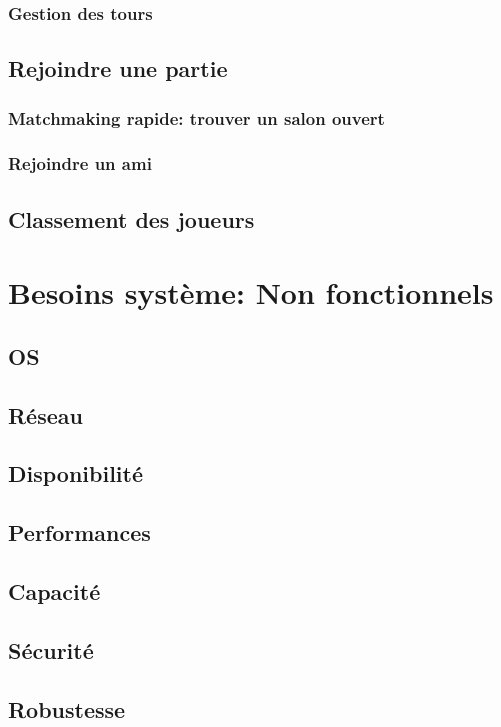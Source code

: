 \documentclass[utf8]{article}
\begin{document}
    \subsubsection{Gestion des tours}
  \subsection{Rejoindre une partie}
    \subsubsection{Matchmaking rapide: trouver un salon ouvert}
    \subsubsection{Rejoindre un ami}
  \subsection{Classement des joueurs}



\section{Besoins système: Non fonctionnels}
  \subsection{OS}
  \subsection{Réseau}
  \subsection{Disponibilité}
  \subsection{Performances}
  \subsection{Capacité}
  \subsection{Sécurité}
  \subsection{Robustesse}
\end{document}

